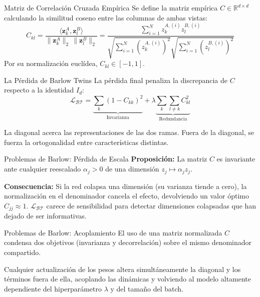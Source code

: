 \documentclass[aspectratio=169, 12pt]{beamer}
\begin{document}
\begin{frame}{Matriz de Correlación Cruzada Empírica}
Se define la matriz empírica $C \in \mathbb{R}^{d \times d}$ calculando la similitud coseno entre las columnas de ambas vistas:
\[
    C_{kl} = \frac{\langle \mathbf{z}_k^A, \mathbf{z}_l^B \rangle}{\|\mathbf{z}_k^A\|_2 \, \|\mathbf{z}_l^B\|_2} = \frac{\sum_{i=1}^{N} z_k^{A,(i)} z_l^{B,(i)}}{\sqrt{\sum_{i=1}^{N} (z_k^{A,(i)})^2} \sqrt{\sum_{i=1}^{N} (z_l^{B,(i)})^2}}
\]
Por su normalización euclídea, $C_{kl} \in [-1, 1]$.
\end{frame}

\begin{frame}{La Pérdida de Barlow Twins}
La pérdida final penaliza la discrepancia de $C$ respecto a la identidad $I_d$:
\[
    \mathcal{L}_{\mathcal{BT}} = \underbrace{\sum_k (1 - C_{kk})^2}_{\text{Invarianza}} + \lambda \underbrace{\sum_k \sum_{l \neq k} C_{kl}^2}_{\text{Redundancia}}
\]

La diagonal acerca las representaciones de las dos ramas. Fuera de la diagonal, se fuerza la ortogonalidad entre características distintas.
\end{frame}

\begin{frame}{Problemas de Barlow: Pérdida de Escala}
\textbf{Proposición:} La matriz $C$ es invariante ante cualquier reescalado $\alpha_j > 0$ de una dimensión $z_j \mapsto \alpha_j z_j$.

\textbf{Consecuencia:} Si la red colapsa una dimensión (su varianza tiende a cero), la normalización en el denominador cancela el efecto, devolviendo un valor óptimo $C_{jj} \approx 1$.
$\mathcal{L}_{\mathcal{BT}}$ carece de sensibilidad para detectar dimensiones colapsadas que han dejado de ser informativas.
\end{frame}

\begin{frame}{Problemas de Barlow: Acoplamiento}
El uso de una matriz normalizada $C$ condensa dos objetivos (invarianza y decorrelación) sobre el mismo denominador compartido. 

Cualquier actualización de los pesos altera simultáneamente la diagonal y los términos fuera de ella, acoplando las dinámicas y volviendo al modelo altamente dependiente del hiperparámetro $\lambda$ y del tamaño del batch.
\end{frame}
\end{document}

